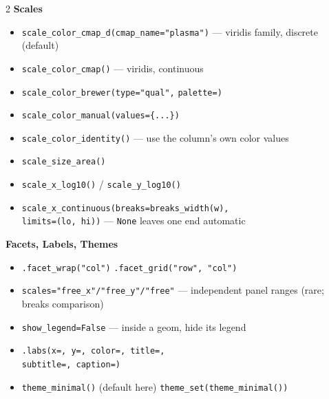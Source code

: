\documentclass[11pt, a4paper]{article}
\newcommand{\code}[1]{\textcolor{codecolor}{\texttt{#1}}}
\newcommand{\head}[1]{\smallskip\textbf{#1}\par\smallskip}
\begin{document}
\begin{multicols}{2}
\head{Scales}
\begin{itemize}
  \item \code{scale\_color\_cmap\_d(cmap\_name="plasma")} --- viridis family, discrete (default)
  \item \code{scale\_color\_cmap()} --- viridis, continuous
  \item \code{scale\_color\_brewer(type="qual",} \code{palette=)}
  \item \code{scale\_color\_manual(values=\{...\})}
  \item \code{scale\_color\_identity()} --- use the column's own color values
  \item \code{scale\_size\_area()}
  \item \code{scale\_x\_log10()} / \code{scale\_y\_log10()}
  \item \code{scale\_x\_continuous(breaks=breaks\_width(w),}\\
        \code{limits=(lo, hi))} --- \code{None} leaves one end automatic
\end{itemize}

\head{Facets, Labels, Themes}
\begin{itemize}
  \item \code{.facet\_wrap("col")} \code{.facet\_grid("row", "col")}
  \item \code{scales="free\_x"/"free\_y"/"free"} --- independent panel ranges (rare; breaks comparison)
  \item \code{show\_legend=False} --- inside a geom, hide its legend
  \item \code{.labs(x=, y=, color=, title=,}\\
        \code{subtitle=, caption=)}
  \item \code{theme\_minimal()} (default here) \code{theme\_set(theme\_minimal())}
\end{itemize}

\end{multicols}
\end{document}
